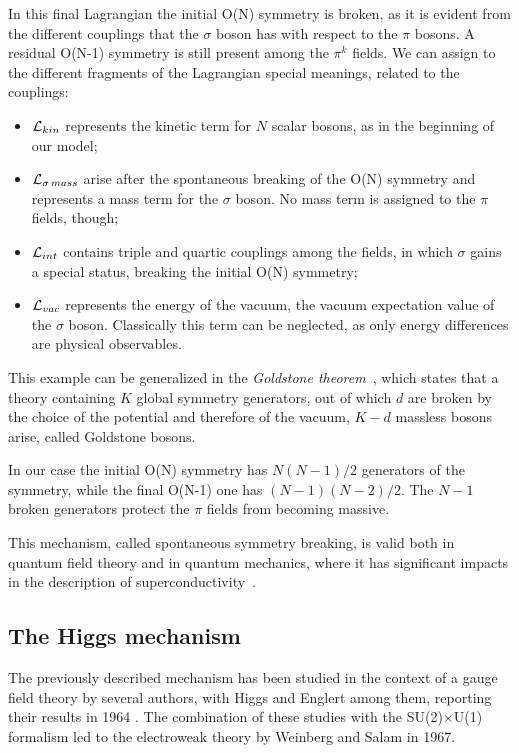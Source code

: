 In this final Lagrangian the initial O(N) symmetry is broken, as it is evident from the different couplings that the $\sigma$ boson has with respect to the $\pi$ bosons. A residual O(N-1) symmetry is still present among the $\pi^k$ fields.
We can assign to the different fragments of the Lagrangian special meanings, related to the couplings:
\begin{itemize}
\item $\mathcal{L}_{kin}$ represents the kinetic term for $N$ scalar bosons, as in the beginning of our model;
\item $\mathcal{L}_{\sigma \, mass}$ arise after the spontaneous breaking of the O(N) symmetry and represents a mass term for the $\sigma$ boson. No mass term is assigned to the $\pi$ fields, though;
\item $\mathcal{L}_{int}$ contains triple and quartic couplings among the fields, in which $\sigma$ gains a special status, breaking the initial O(N) symmetry;
\item $\mathcal{L}_{vac}$ represents the energy of the vacuum, the vacuum expectation value of the $\sigma$ boson. Classically this term can be neglected, as only energy differences are physical observables.
\end{itemize}

This example can be generalized in the \emph{Goldstone theorem}~\cite{1962PhRv..127..965G}, which states that a theory containing $K$ global symmetry generators, out of which $d$ are broken by the choice of the potential and therefore of the vacuum, $K - d$ massless bosons arise, called Goldstone bosons. 

In our case the initial O(N) symmetry has $N(N-1)/2$ generators of the symmetry, while the final O(N-1) one has $(N-1)(N-2)/2$. The $N-1$ broken generators protect the $\pi$ fields from becoming massive.

This mechanism, called spontaneous symmetry breaking, is valid both in quantum field theory and in quantum mechanics, where it has significant impacts in the description of superconductivity~\cite{Nambu:1960tm}.

\subsection{The Higgs mechanism}

The previously described mechanism has been studied in the context of a gauge field theory by several authors, with Higgs and Englert among them, reporting their results in 1964 \cite{Englert:1964et, Higgs:1964ia}. The combination of these studies with the SU(2)$\times$U(1) formalism led to the electroweak theory by Weinberg and Salam in 1967.

